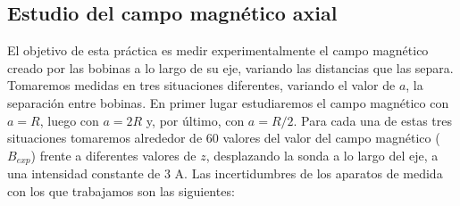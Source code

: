\documentclass[a4paper,12pt,titlepage]{report}
\begin{document}
\subsection{Estudio del campo magnético axial}

El objetivo de esta práctica es medir experimentalmente el campo magnético creado por las bobinas a lo largo de su eje, variando las distancias que las separa. Tomaremos medidas en tres situaciones diferentes, variando el valor de $a$, la separación entre bobinas. En primer lugar estudiaremos el campo magnético con $a=R$, luego con $a=2R$ y, por último, con $a=R/2$. Para cada una de estas tres situaciones tomaremos alrededor de 60 valores del valor del campo magnético ($B_{exp}$) frente a diferentes valores de $z$, desplazando la sonda a lo largo del eje, a una intensidad constante de 3 A. Las incertidumbres de los aparatos de medida con los que trabajamos son las siguientes:
\end{document}
